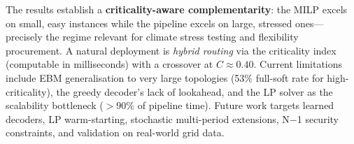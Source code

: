 \documentclass[10pt]{article}
\begin{document}
The results establish a \textbf{criticality-aware complementarity}: the MILP excels on small, easy instances while the pipeline excels on large, stressed ones---precisely the regime relevant for climate stress testing and flexibility procurement. A natural deployment is \emph{hybrid routing} via the criticality index (computable in milliseconds) with a crossover at $C \approx 0.40$. Current limitations include EBM generalisation to very large topologies (53\% full-soft rate for high-criticality), the greedy decoder's lack of lookahead, and the LP solver as the scalability bottleneck ($>90\%$ of pipeline time). Future work targets learned decoders, LP warm-starting, stochastic multi-period extensions, N$-$1 security constraints, and validation on real-world grid data.

\vspace{-2pt}
{\footnotesize


}
\end{document}
